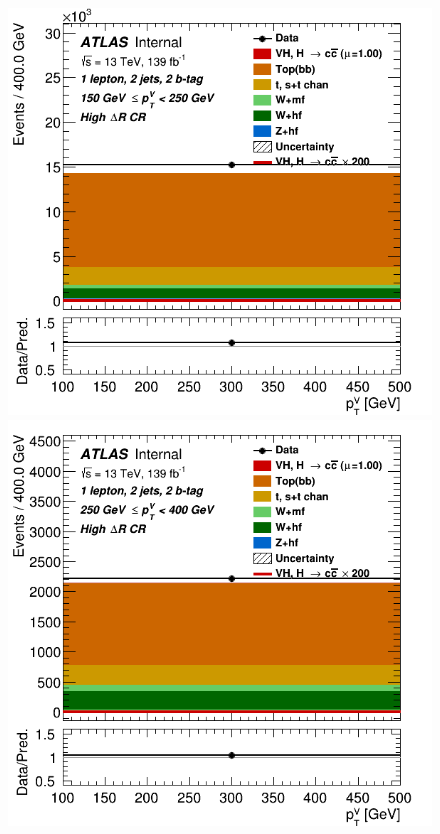 \begin{figure}[h!]
\vspace{0.1cm}
\center
\includegraphics[scale=0.3]{Images/VH/SRsandTopCRs/Region_distpTV_DCRHigh_BMax250_L1_Y6051_TTypebb_T2_J2_BMin150_Prefit.png}
\includegraphics[scale=0.3]{Images/VH/SRsandTopCRs/Region_distpTV_DCRHigh_BMax400_L1_Y6051_TTypebb_T2_J2_BMin250_Prefit.png}\\

\end{figure}

